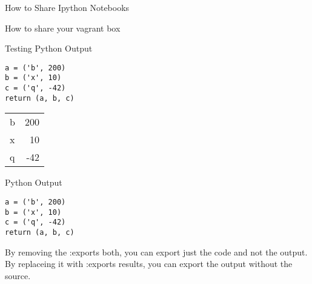\documentclass[presentation]{beamer}
\begin{document}
\begin{frame}[label=sec-9-0-3]{How to Share Ipython Notebooks}
\end{frame}
\begin{frame}[label=sec-9-0-4]{How to share your vagrant box}
\end{frame}
\begin{frame}[fragile,label=sec-9-0-5]{Testing Python Output}
 \lstset{numbers=left,language=Python,label= ,caption= }
\begin{lstlisting}
a = ('b', 200)
b = ('x', 10)
c = ('q', -42)
return (a, b, c)
\end{lstlisting}

\begin{center}
\begin{tabular}{lr}
b & 200\\
x & 10\\
q & -42\\
\end{tabular}
\end{center}
\end{frame}

\begin{frame}[fragile,label=sec-9-0-6]{Python Output}
 \lstset{numbers=left,language=Python,label= ,caption= }
\begin{lstlisting}
a = ('b', 200)
b = ('x', 10)
c = ('q', -42)
return (a, b, c)
\end{lstlisting}

By removing the :exports both, you can export just the code and not the output. By replaceing it with :exports results, you can export the output without the source. 
\end{frame}
\end{document}
